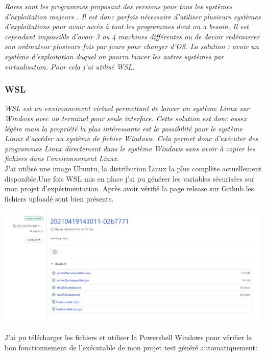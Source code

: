 \documentclass[french,a4paper,12pt]{report}
\begin{document}
\textit{Rares sont les programmes proposant des versions pour tous les systèmes d’exploitation majeurs . Il est donc parfois nécessaire d’utiliser plusieurs systèmes d’exploitations pour avoir accès à tout les programmes dont on a besoin.  Il est cependant impossible d’avoir 3 ou 4 machines différentes ou de devoir redémarrer son ordinateur plusieurs fois par jours pour changer d’OS. La solution : avoir un système d’exploitation duquel on pourra lancer les autres systèmes par virtualisation. Pour cela j’ai utilisé WSL.}

\subsubsection{WSL}

\textit{WSL est un environnement virtuel permettant de lancer un système Linux sur Windows avec un terminal pour seule interface. Cette solution est donc assez légère mais la propriété la plus intéressante est la possibilité pour le système Linux d’accéder au système de fichier Windows. Cela permet donc d’exécuter des programmes Linux directement dans le système Windows sans avoir à copier les fichiers dans l’environnement Linux.}\\

J’ai utilisé une image Ubuntu, la distribution Linux la plus complète actuellement disponible.Une fois WSL mis en place j’ai pu générer les variables sécurisées sur mon projet d'expérimentation. Après avoir vérifié la page release sur Github les fichiers uploadé sont bien présents.

\begin{center}
  \includegraphics[width=\textwidth]{ressources/images/github.png}
\end{center}

J'ai pu télécharger les fichiers et utiliser la Powershell Windows pour vérifier le bon fonctionnement de l’exécutable de mon projet test généré automatiquement:
\end{document}
